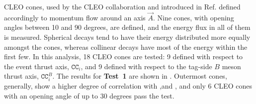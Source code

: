 CLEO cones, used by the CLEO collaboration and introduced in Ref.\cite{CLEO:1995rok} defined accordingly to momentum flow around an axis $\vec{A}$.
Nine cones, with opening angles between 10 and 90 degrees, are defined, and the energy flux in all of them is measured.
Spherical decays tend to have their energy distributed more equally amongst the cones, whereas collinear decays have most of the energy within the first few.
In this analysis, 18 CLEO cones are tested: 9 defined with respect to the event thrust axis, $\mathtt{CC}_{i}$, and 9 defined with respect to the tag-side $B$ meson thrust axis, $\mathtt{CC}^B_{i}$.
The results for \textbf{Test~1} are shown in .
Outermost cones, generally, show a higher degree of correlation with \EB,\Estar and \Mbc, and only 6 CLEO cones with an opening angle of up to 30 degrees pass the test.

